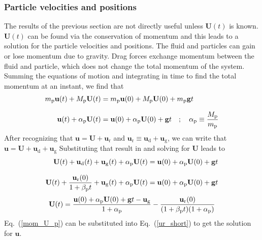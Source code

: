 \subsubsection*{Particle velocities and positions}

The results of the previous section are not directly useful unless $\mathbf{U}(t)$ is known. $\mathbf{U}(t)$ can be found via the conservation of momentum and this leads to a solution for the particle velocities and positions. The fluid and particles can gain or lose momentum due to gravity. Drag forces exchange momentum between the fluid and particle, which does not change the total momentum of the system. Summing the equations of motion and integrating in time to find the total momentum at an instant, we find that
\begin{align}
    m_{\rm p} \mathbf{u}(t) + M_{\rm p} \mathbf{U}(t) &= m_{\rm p} \mathbf{u}(0) + M_{\rm p} \mathbf{U}(0) + m_{\rm p} \mathbf{g} t  \\[.1in]
    \label{part_mom_cons}
    \mathbf{u}(t) + \alpha_{\rm p} \mathbf{U}(t) &= \mathbf{u}(0) + \alpha_{\rm p} \mathbf{U}(0) + \mathbf{g} t \quad ; \quad \alpha_{\rm p} \equiv \frac{M_{\rm p}}{m_{\rm p}}
\end{align}
After recognizing that $\mathbf{u} = \mathbf{U} + \mathbf{u}_\text{r}$ and $\mathbf{u}_\text{r} \equiv \mathbf{u}_\text{d} + \mathbf{u}_\text{g}$, we can write that $\mathbf{u} = \mathbf{U} + \mathbf{u}_\text{d} + \mathbf{u}_\text{g}$ Substituting that result in and solving for $\mathbf{U}$ leads to
\begin{align*}
    \mathbf{U}(t) + \mathbf{u}_\text{d}(t) + \mathbf{u}_\text{g}(t) + \alpha_{\rm p} \mathbf{U}(t) &= \mathbf{u}(0) + \alpha_{\rm p} \mathbf{U}(0) + \mathbf{g} t  \\[.1in]
    \mathbf{U}(t) + \frac{\mathbf{u}_{\text{r}}(0)}{1 + \beta_{\rm p} t} + \mathbf{u}_\text{g}(t) + \alpha_{\rm p} \mathbf{U}(t) &= \mathbf{u}(0) + \alpha_{\rm p} \mathbf{U}(0) + \mathbf{g} t
\end{align*}
\begin{align}
    \label{mom_U_p}
    \mathbf{U}(t) = \frac{\mathbf{u}(0) + \alpha_{\rm p} \mathbf{U}(0) + \mathbf{g} t - \mathbf{u}_\text{g}}{1 + \alpha_{\rm p}} - \frac{\mathbf{u}_{\text{r}}(0)}{(1 + \beta_{\rm p} t)(1 + \alpha_{\rm p})}
\end{align}
Eq.\ (\ref{mom_U_p}) can be substituted into Eq.\ (\ref{ur_short}) to get the solution for $\mathbf{u}$.
